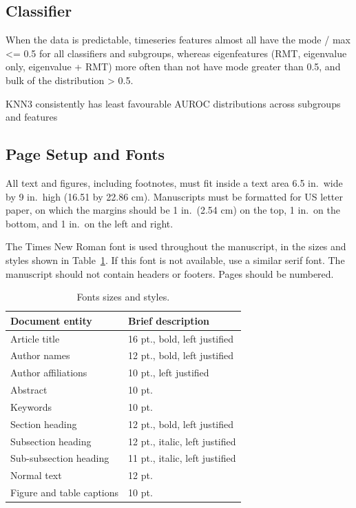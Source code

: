 \documentclass[12pt]{spieman}  %
\begin{document}
\begin{spacing}{2}
\subsection{Classifier}
When the data is predictable, timeseries features almost all have the mode / max <= 0.5 for all
classifiers and subgroups, whereas eigenfeatures (RMT, eigenvalue only, eigenvalue + RMT) more often
than not have mode greater than 0.5, and bulk of the distribution > 0.5.

KNN3 consistently has least favourable AUROC distributions across subgroups and features

\subsection{Page Setup and Fonts}

All text and figures, including footnotes, must fit inside a text area 6.5 in.\ wide by 9 in.\ high (16.51 by 22.86 cm). Manuscripts must be formatted for US letter paper, on which the margins should be 1 in.\ (2.54 cm) on the top, 1 in.\ on the bottom, and 1 in.\ on the left and right.

The Times New Roman font is used throughout the manuscript, in the sizes and styles shown in Table~\ref{tab:fonts}. If this font is not available, use a similar serif font. The manuscript should not contain headers or footers. Pages should be numbered.

\begin{table}[ht]
\caption{Fonts sizes and styles.}
\label{tab:fonts}
\begin{center}
\begin{tabular}{|l|l|} %
\hline
\rule[-1ex]{0pt}{3.5ex}  Document entity & Brief description  \\
\hline\hline
\rule[-1ex]{0pt}{3.5ex}  Article title & 16 pt., bold, left justified  \\
\hline
\rule[-1ex]{0pt}{3.5ex}  Author names & 12 pt., bold, left justified   \\
\hline
\rule[-1ex]{0pt}{3.5ex}  Author affiliations & 10 pt., left justified   \\
\hline
\rule[-1ex]{0pt}{3.5ex}  Abstract & 10 pt.  \\
\hline
\rule[-1ex]{0pt}{3.5ex}  Keywords & 10 pt.  \\
\hline
\rule[-1ex]{0pt}{3.5ex}  Section heading & 12 pt., bold, left justified  \\
\hline
\rule[-1ex]{0pt}{3.5ex}  Subsection heading & 12 pt., italic, left justified  \\
\hline
\rule[-1ex]{0pt}{3.5ex}  Sub-subsection heading & 11 pt., italic, left justified  \\
\hline
\rule[-1ex]{0pt}{3.5ex}  Normal text & 12 pt. \\
\hline
\rule[-1ex]{0pt}{3.5ex}  Figure and table captions &  10 pt. \\
\hline
\end{tabular}
\end{center}
\end{table}


\end{spacing}
\end{document}
